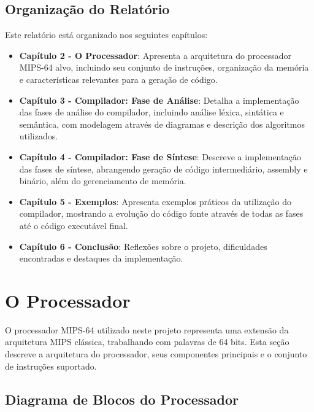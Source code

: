 \documentclass[
	12pt,				%
	oneside,
	a4paper,			%
	english,			%
	french,				%
	spanish,			%
	brazil,				%
	]{abntex2}
\begin{document}
\section{Organização do Relatório}

Este relatório está organizado nos seguintes capítulos:

\begin{itemize}
    \item \textbf{Capítulo 2 - O Processador}: Apresenta a arquitetura do processador MIPS-64 alvo, incluindo seu conjunto de instruções, organização da memória e características relevantes para a geração de código.
    
    \item \textbf{Capítulo 3 - Compilador: Fase de Análise}: Detalha a implementação das fases de análise do compilador, incluindo análise léxica, sintática e semântica, com modelagem através de diagramas e descrição dos algoritmos utilizados.
    
    \item \textbf{Capítulo 4 - Compilador: Fase de Síntese}: Descreve a implementação das fases de síntese, abrangendo geração de código intermediário, assembly e binário, além do gerenciamento de memória.
    
    \item \textbf{Capítulo 5 - Exemplos}: Apresenta exemplos práticos da utilização do compilador, mostrando a evolução do código fonte através de todas as fases até o código executável final.
    
    \item \textbf{Capítulo 6 - Conclusão}: Reflexões sobre o projeto, dificuldades encontradas e destaques da implementação.
\end{itemize}

\chapter{O Processador}

O processador MIPS-64 utilizado neste projeto representa uma extensão da arquitetura MIPS clássica, trabalhando com palavras de 64 bits. Esta seção descreve a arquitetura do processador, seus componentes principais e o conjunto de instruções suportado.

\section{Diagrama de Blocos do Processador}
\end{document}
